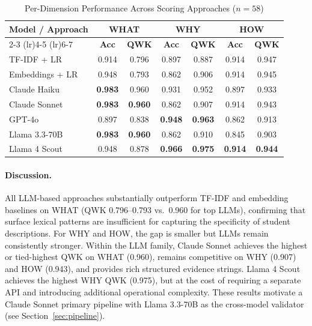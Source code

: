 \documentclass[11pt]{article}
\begin{document}
\begin{table}[H]
\centering
\caption{Per-Dimension Performance Across Scoring Approaches ($n=58$)}
\label{tab:exp2}
\begin{tabular}{lcccccc}
\toprule
\multirow{2}{*}{\textbf{Model / Approach}} & \multicolumn{2}{c}{\textbf{WHAT}} & \multicolumn{2}{c}{\textbf{WHY}} & \multicolumn{2}{c}{\textbf{HOW}} \\
\cmidrule(lr){2-3} \cmidrule(lr){4-5} \cmidrule(lr){6-7}
 & \textbf{Acc} & \textbf{QWK} & \textbf{Acc} & \textbf{QWK} & \textbf{Acc} & \textbf{QWK} \\
\midrule
TF-IDF + LR        & 0.914 & 0.796 & 0.897 & 0.887 & 0.914 & 0.947 \\
Embeddings + LR    & 0.948 & 0.793 & 0.862 & 0.906 & 0.914 & 0.945 \\
\midrule
Claude Haiku       & \textbf{0.983} & 0.960 & 0.931 & 0.952 & 0.897 & 0.933 \\
Claude Sonnet      & \textbf{0.983} & \textbf{0.960} & 0.862 & 0.907 & 0.914 & 0.943 \\
GPT-4o             & 0.897 & 0.838 & \textbf{0.948} & \textbf{0.963} & 0.862 & 0.913 \\
Llama 3.3-70B      & \textbf{0.983} & \textbf{0.960} & 0.862 & 0.910 & 0.845 & 0.903 \\
Llama 4 Scout      & 0.948 & 0.878 & \textbf{0.966} & \textbf{0.975} & \textbf{0.914} & \textbf{0.944} \\
\bottomrule
\end{tabular}
\end{table}

\paragraph{Discussion.} All LLM-based approaches substantially outperform TF-IDF and embedding baselines on WHAT (QWK 0.796--0.793 vs.\ 0.960 for top LLMs), confirming that surface lexical patterns are insufficient for capturing the specificity of student descriptions. For WHY and HOW, the gap is smaller but LLMs remain consistently stronger. Within the LLM family, Claude Sonnet achieves the highest or tied-highest QWK on WHAT (0.960), remains competitive on WHY (0.907) and HOW (0.943), and provides rich structured evidence strings. Llama 4 Scout achieves the highest WHY QWK (0.975), but at the cost of requiring a separate API and introducing additional operational complexity. These results motivate a Claude Sonnet primary pipeline with Llama 3.3-70B as the cross-model validator (see Section~\ref{sec:pipeline}).
\end{document}
